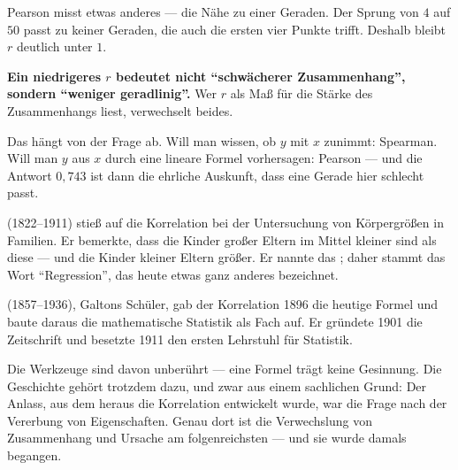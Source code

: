 \begin{aufgabe}
Pearson misst etwas anderes --- die Nähe zu einer Geraden. Der Sprung von $4$ auf $50$ passt zu keiner Geraden, die auch die ersten vier Punkte trifft. Deshalb bleibt $r$ deutlich unter $1$.

\begin{center}
\begin{minipage}{0.9\textwidth}
\textbf{Ein niedrigeres $r$ bedeutet nicht \enquote{schwächerer Zusammenhang}, sondern \enquote{weniger geradlinig}.} Wer $r$ als Maß für die Stärke des Zusammenhangs liest, verwechselt beides.
\end{minipage}
\end{center}

Das hängt von der Frage ab. Will man wissen, ob $y$ mit $x$ zunimmt: Spearman. Will man $y$ aus $x$ durch eine lineare Formel vorhersagen: Pearson --- und die Antwort $0{,}743$ ist dann die ehrliche Auskunft, dass eine Gerade hier schlecht passt.
\end{aufgabe}

\begin{geschichte}
 (1822--1911) stieß auf die Korrelation bei der Untersuchung von Körpergrößen in Familien. Er bemerkte, dass die Kinder großer Eltern im Mittel kleiner sind als diese --- und die Kinder kleiner Eltern größer. Er nannte das ; daher stammt das Wort \enquote{Regression}, das heute etwas ganz anderes bezeichnet.

 (1857--1936), Galtons Schüler, gab der Korrelation 1896 die heutige Formel und baute daraus die mathematische Statistik als Fach auf. Er gründete 1901 die Zeitschrift  und besetzte 1911 den ersten Lehrstuhl für Statistik.

\begin{center}
\begin{minipage}{0.9\textwidth}
\end{minipage}
\end{center}

Die Werkzeuge sind davon unberührt --- eine Formel trägt keine Gesinnung. Die Geschichte gehört trotzdem dazu, und zwar aus einem sachlichen Grund: Der Anlass, aus dem heraus die Korrelation entwickelt wurde, war die Frage nach der Vererbung von Eigenschaften. Genau dort ist die Verwechslung von Zusammenhang und Ursache am folgenreichsten --- und sie wurde damals begangen.
\end{geschichte}

